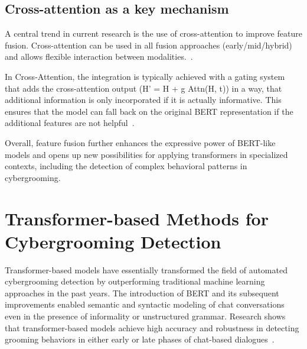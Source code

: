 \subsection{Cross-attention as a key mechanism}
A central trend in current research is the use of cross-attention to improve feature fusion. Cross-attention can be used in all fusion approaches (early/mid/hybrid) and allows flexible interaction between modalities.~\cite{nagrani2021attention,khan2020mmft}. 
   
In Cross-Attention, the integration is typically achieved with a gating system that adds the cross-attention output (H' = H + g \odot Attn(H, t)) in a way, that additional information is only incorporated if it is actually informative. This ensures that the model can fall back on the original BERT representation if the additional features are not helpful~\cite{cai2025multimodal}.

Overall, feature fusion further enhances the expressive power of BERT-like models and opens up new possibilities for applying transformers in specialized contexts, including the detection of complex behavioral patterns in cybergrooming.


\section{Transformer-based Methods for Cybergrooming Detection}

Transformer-based models have essentially transformed the field of automated cybergrooming detection by outperforming traditional machine learning approaches in the past years. The introduction of BERT and its subsequent improvements enabled semantic and syntactic modeling of chat conversations even in the presence of informality or unstructured grammar. Research shows that transformer-based models achieve high accuracy and robustness in detecting grooming behaviors in either early or late phases of chat-based dialogues~\cite{vogt2021early,street2024grooming,borj2022online,hamm2025llms}.

